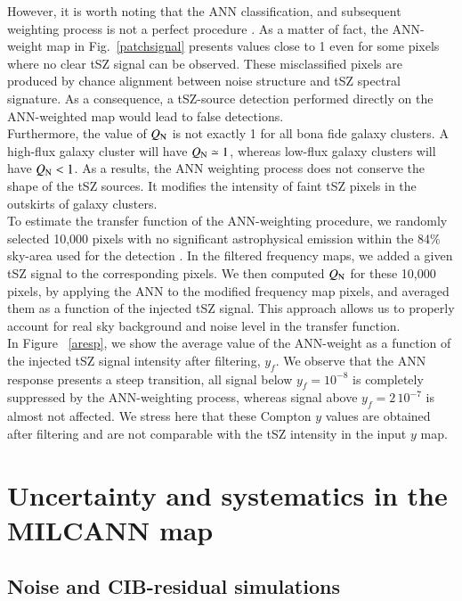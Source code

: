 \documentclass[traditabstract,a4,twocolumn]{aa}
\begin{document}
However, it is worth noting that the ANN classification, and subsequent weighting process is not a perfect procedure  \citep[see also][]{agh14}. As a matter of fact, the ANN-weight map in Fig.~\ref{patchsignal} presents values close to 1 even for some pixels where no clear tSZ signal can be
observed. These misclassified pixels are produced by chance alignment
between noise structure and tSZ spectral signature. As a consequence,
a tSZ-source detection performed directly on the ANN-weighted map would
lead to false detections.\\ 
Furthermore, the value of $Q_{\rm N}$ is not exactly 1 for all bona fide galaxy clusters. A high-flux galaxy cluster will have $Q_{\rm N} \simeq 1$, whereas low-flux galaxy clusters will have $Q_{\rm N} < 1$. As a results, the ANN weighting process does
not conserve the shape of the tSZ sources. It modifies the intensity of faint tSZ pixels in the outskirts of galaxy clusters.\\
To estimate the transfer function of the ANN-weighting procedure, we randomly selected 10,000 pixels with no significant astrophysical emission within the 84\% sky-area used for the detection \citep[see][for a description of the mask]{planckPSZ}. In the filtered frequency maps, we added a given tSZ signal to the corresponding pixels.
We then computed $Q_{\rm N}$ for these 10,000 pixels, by applying the ANN to the modified frequency map pixels, and averaged them as a function of the injected tSZ signal. This approach allows us to properly account for real sky background and noise level in the transfer function.\\
In Figure ~\ref{aresp}, we show
the average value of the ANN-weight as a function of the injected tSZ
signal intensity after filtering, $y_f$. We observe that the ANN response presents a steep
transition, all signal below $y_f = 10^{-8}$ is completely suppressed
by the ANN-weighting process, whereas signal above $y_f = 2\, 10^{-7}$ is almost not
affected. We stress here that these Compton $y$ values are obtained after filtering and are not comparable with the tSZ intensity in the input $y$ map.  

\section{Uncertainty and systematics in the MILCANN map}
\label{sec_noise}

\subsection{Noise and CIB-residual simulations}
\end{document}
